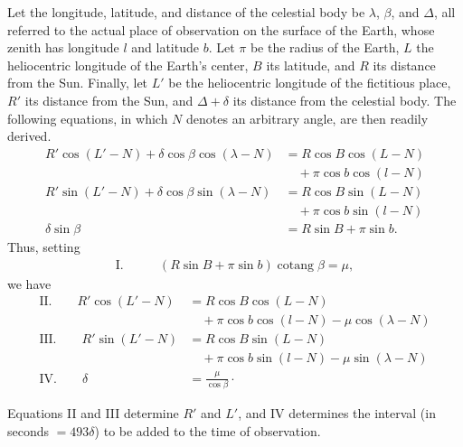 Let the longitude, latitude, and distance of the celestial body be $\lambda$, $\beta$, and $\Delta$, all referred to the actual place of observation on the surface of the Earth, whose zenith has longitude $l$ and latitude $b$. Let $\pi$ be the radius of the Earth, $L$ the heliocentric longitude of the Earth's center, $B$ its latitude, and $R$ its distance from the Sun. Finally, let $L'$ be the heliocentric longitude of the fictitious place, $R'$ its distance from the Sun, and $\Delta+\delta$ its distance from the celestial body. The following equations, in which $N$ denotes an arbitrary angle, are then readily derived.
\[
\begin{aligned}
R'\cos(L'-N)+\delta\cos\beta\cos(\lambda-N)
  &=R\cos B\cos(L-N)\\
  &\quad+\pi\cos b\cos(l-N)\\
R'\sin(L'-N)+\delta\cos\beta\sin(\lambda-N)
  &=R\cos B\sin(L-N)\\
  &\quad+\pi\cos b\sin(l-N)\\
\delta\sin\beta&=R\sin B+\pi\sin b.
\end{aligned}
\]
Thus, setting
\[
\begin{aligned}
\mathrm{I.}\qquad &(R\sin B+\pi\sin b)\operatorname{cotang}\beta=\mu,
\end{aligned}
\]
we have
\[
\begin{aligned}
\mathrm{II.}\qquad R'\cos(L'-N)&=R\cos B\cos(L-N)\\
 &\quad+\pi\cos b\cos(l-N)-\mu\cos(\lambda-N)\\
\mathrm{III.}\qquad R'\sin(L'-N)&=R\cos B\sin(L-N)\\
 &\quad+\pi\cos b\sin(l-N)-\mu\sin(\lambda-N)\\
\mathrm{IV.}\qquad \delta&=\frac{\mu}{\cos\beta}\mathpunct{\cdot}
\end{aligned}
\]

Equations II and III determine $R'$ and $L'$, and IV determines the interval (in seconds $=493\delta$) to be added to the time of observation.

